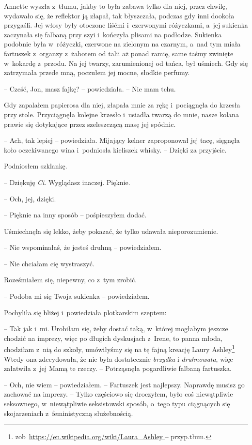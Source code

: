 \documentclass[oneside,polish,11pt,sfheadings]{mwbk}
\begin{document}
Annette wyszła z~tłumu, jakby to była zabawa tylko dla niej, przez
chwilę, wydawało się, że reflektor ją złapał, tak błyszczała, podczas
gdy inni dookoła przygaśli. Jej włosy były otoczone liśćmi i~czerwonymi
różyczkami, a~jej sukienka zaczynała się falbaną przy szyi i~kończyła
plisami na podłodze. Sukienka podobnie była w~różyczki, czerwone na
zielonym na czarnym, a~nad tym miała fartuszek z~organzy z~żabotem od
talii aż ponad ramię, same taśmy zwinięte w~kokardę z~przodu. Na jej
twarzy, zarumienionej od tańca, był uśmiech. Gdy się zatrzymała przede
mną, poczułem jej mocne, słodkie perfumy.

-- Cześć, Jon, masz fajkę? -- powiedziała. -- Nie mam tchu.

Gdy zapalałem papierosa dla niej, złapała mnie za rękę i~pociągnęła do
krzesła przy stole. Przyciągnęła kolejne krzesło i~usiadła twarzą do
mnie, nasze kolana prawie się dotykające przez szeleszczącą masę jej
spódnic.

-- Ach, tak lepiej -- powiedziała. Mijający kelner zaproponował jej tacę,
sięgnęła koło oczekiwanego wina i~podniosła kieliszek whisky. -- Dzięki
za przyjście.

Podniosłem szklankę. 

-- Dziękuję \emph{Ci}. Wyglądasz inaczej. Pięknie.

-- Och, jej, dzięki.

-- Pięknie na inny sposób -- pośpieszyłem dodać.

Uśmiechnęła się lekko, żeby pokazać, że tylko udawała nieporozumienie.

-- Nie wspominałaś, że jesteś druhną -- powiedziałem.

-- Nie chciałam cię wystraszyć.

Roześmiałem się, niepewny, co z~tym zrobić. 

-- Podoba mi się Twoja
sukienka -- powiedziałem.

Pochyliła się bliżej i~powiedziała plotkarskim szeptem: 

-- Tak jak i~mi.
Urobiłam się, żeby dostać taką, w~której mogłabym jeszcze chodzić na
imprezy, więc po długich dyskusjach z~Irene, to panna młoda, chodziłam z~nią do szkoły, umówiłyśmy się na tę fajną kreację Laury Ashley\footnote{
zob~\url{https://en.wikipedia.org/wiki/Laura_Ashley } -- przyp.tłum.} Wtedy ona zdecydowała, że nie była dostatecznie
\emph{brzydka }i \emph{druhnowata}, więc załatwiła z~jej Mamą te rzeczy.
-- Potrząsnęła pogardliwie falbaną fartuszka.

-- Och, nie wiem -- powiedziałem. -- Fartuszek jest najlepszy. Naprawdę
musisz go zachować na imprezy. -- Tylko częściowo się droczyłem, było coś
niewątpliwie seksownego, w~niewątpliwie seksistowski sposób, o~tego typu
ciągnących się skojarzeniach z~feministyczną służebnością.
\end{document}
